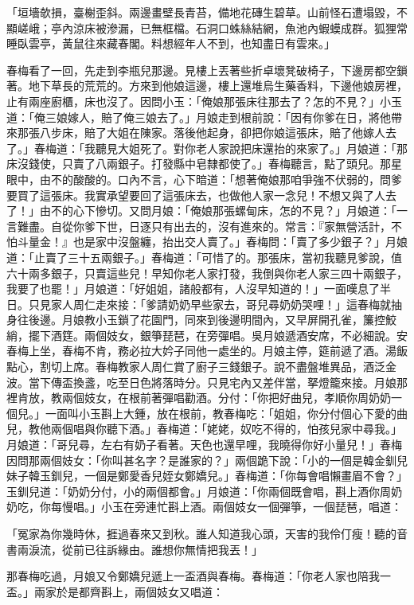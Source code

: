\begin{showcontents}{}
「垣墻欹損，臺榭歪斜。兩邊畫壁長青苔，備地花磚生碧草。山前怪石遭塌毀，不顯嵯峨；亭內涼床被滲漏，已無框檔。石洞口蛛絲結網，魚池內蝦蟆成群。狐狸常睡臥雲亭，黃鼠往來藏春閣。料想經年人不到，也知盡日有雲來。」

春梅看了一回，先走到李瓶兒那邊。見樓上丟著些折卓壞凳破椅子，下邊房都空鎖著。地下草長的荒荒的。方來到他娘這邊，樓上還堆烏生藥香料，下邊他娘房裡，止有兩座廚櫃，床也沒了。因問小玉：「俺娘那張床往那去了？怎的不見？」小玉道：「俺三娘嫁人，賠了俺三娘去了。」月娘走到根前說：「因有你爹在日，將他帶來那張八步床，賠了大姐在陳家。落後他起身，卻把你娘這張床，賠了他嫁人去了。」春梅道：「我聽見大姐死了。對你老人家說把床還抬的來家了。」月娘道：「那床沒錢使，只賣了八兩銀子。打發縣中皂隸都使了。」春梅聽言，點了頭兒。那星眼中，由不的酸酸的。口內不言，心下暗道：「想著俺娘那咱爭強不伏弱的，問爹要買了這張床。我實承望要回了這張床去，也做他人家一念兒！不想又與了人去了！」由不的心下慘切。又問月娘：「俺娘那張螺甸床，怎的不見？」月娘道：「一言難盡。自從你爹下世，日逐只有出去的，沒有進來的。常言：『家無營活計，不怕斗量金！』也是家中沒盤纏，抬出交人賣了。」春梅問：「賣了多少銀子？」月娘道：「止賣了三十五兩銀子。」春梅道：「可惜了的。那張床，當初我聽見爹說，值六十兩多銀子，只賣這些兒！早知你老人家打發，我倒與你老人家三四十兩銀子，我要了也罷！」月娘道：「好姐姐，諸般都有，人沒早知道的！」一面嘆息了半日。只見家人周仁走來接：「爹請奶奶早些家去，哥兒尋奶奶哭哩！」這春梅就抽身往後邊。月娘教小玉鎖了花園門，同來到後邊明間內，又早屏開孔雀，簾控鮫綃，擺下酒筳。兩個妓女，銀箏琵琶，在旁彈唱。吳月娘遞酒安席，不必細說。安春梅上坐，春梅不肯，務必拉大妗子同他一處坐的。月娘主停，筵前遞了酒。湯飯點心，割切上席。春梅教家人周仁賞了廚子三錢銀子。說不盡盤堆異品，酒泛金波。當下傳盃換盞，吃至日色將落時分。只見宅內又差伴當，拏燈籠來接。月娘那裡肯放，教兩個妓女，在根前著彈唱勸酒。分付：「你把好曲兒，孝順你周奶奶一個兒。」一面叫小玉斟上大鍾，放在根前，教春梅吃：「姐姐，你分付個心下愛的曲兒，教他兩個唱與你聽下酒。」春梅道：「姥姥，奴吃不得的，怕孩兒家中尋我。」月娘道：「哥兒尋，左右有奶子看著。天色也還早哩，我曉得你好小量兒！」春梅因問那兩個妓女：「你叫甚名字？是誰家的？」兩個跪下說：「小的一個是韓金釧兒妹子韓玉釧兒，一個是鄭愛香兒姪女鄭嬌兒。」春梅道：「你每會唱懶畫眉不會？」玉釧兒道：「奶奶分付，小的兩個都會。」月娘道：「你兩個既會唱，斟上酒你周奶奶吃，你每慢唱。」小玉在旁連忙斟上酒。兩個妓女一個彈箏，一個琵琶，唱道：

「冤家為你幾時休，捱過春來又到秋。誰人知道我心頭，天害的我伶仃瘦！聽的音書兩淚流，從前已往訴緣由。誰想你無情把我丟！」

那春梅吃過，月娘又令鄭嬌兒遞上一盃酒與春梅。春梅道：「你老人家也陪我一盃。」兩家於是都齊斟上，兩個妓女又唱道：


\end{showcontents}

